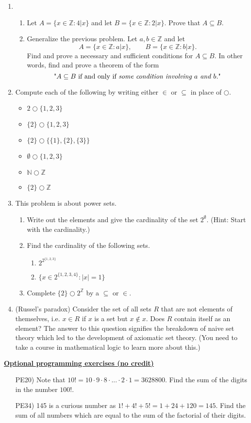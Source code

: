 \documentclass[11pt]{preprint}
\def\enumb{\begin{enumerate}}
\def\enume{\end{enumerate}}
\def\itemb{\begin{itemize}}
\def\iteme{\end{itemize}}
\def\integers{\mathbb{Z}}
\begin{document}
\begin{enumerate}
\item
\enumb
\item Let $A=\{x\in\mathbb{Z}:4|x\}$ and let $B=\{x\in\integers:2|x\}$.  Prove that $A\subseteq B$.
\item Generalize the previous problem. Let $a,b\in\integers$ and let
\[
A=\{x\in\integers:a|x\},\qquad B=\{x\in\integers: b|x\}.
\]
Find and prove a necessary and sufficient conditions for $A\subseteq B$. In other words, find and prove a theorem of the form
\[
\textrm{"$A\subseteq B$ if and only if \textit{some condition involving $a$ and $b$.}"}
\]
\enume

\item Compute each of the following by writing either $\in$ or $\subseteq$ in place of $\bigcirc$.

\itemb
\item $2\bigcirc\{1,2,3\}$
\item $\{2\}\bigcirc\{1,2,3\}$
\item $\{2\}\bigcirc\{\{1\},\{2\},\{3\}\}$
\item $\emptyset\bigcirc\{1,2,3\}$
\item $\mathbb{N}\bigcirc\integers$
\item $\{2\}\bigcirc\integers$
\iteme


\item This problem is about power sets.
\enumb
\item Write out the elements and give the cardinality of the set $2^{\emptyset}$. (Hint: Start with the cardinality.)
\item Find the cardinality of the following sets.
\enumb
\item $2^{2^{\{1,2,3\}}}$
\item $\{x\in 2^{\{1,2,3,4\}}:|x|=1\}$
\enume 
\item Complete $\{2\}\bigcirc 2^{\integers}$ by a $\subseteq$ or $\in$.
\enume

\item (Russel's paradox) Consider the set of all sets $R$ that are not elements of themselves, i.e. $x\in R$ if $x$ is a set but $x\notin x$. Does $R$ contain itself as an element? The answer to this question signifies the breakdown of naive set theory which led to the development of axiomatic set theory. (You need to take a course in mathematical logic to learn more about this.)

\end{enumerate}

\underline{\textbf{Optional programming exercises (no credit)}}
\begin{enumerate}
\item[PE20)] Note that $10!=10\cdot 9\cdot 8\cdot...\cdot 2\cdot 1= 3628800$. Find the sum of the digits in the number $100!$.
\item[PE34)] 145 is a curious number as $1!+4!+5!=1+24+120=145$. Find the sum of all numbers which are equal to the sum of the factorial of their digits.
\end{enumerate}
\end{document}
